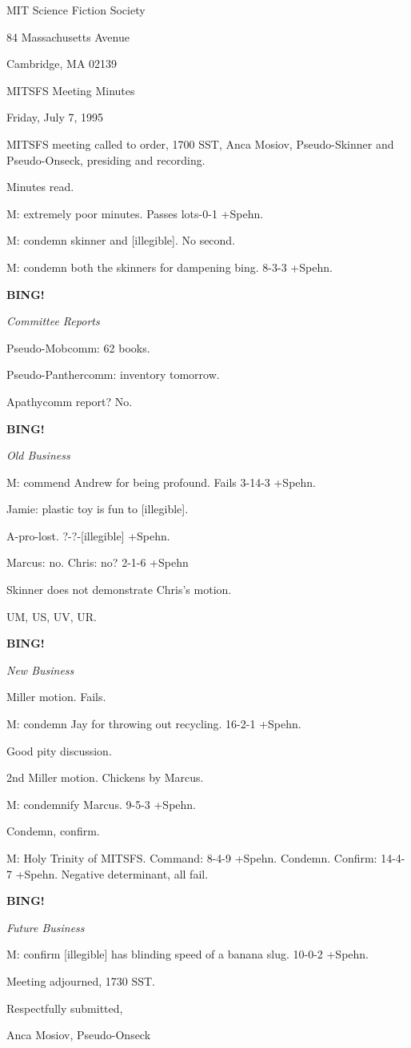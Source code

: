 \documentclass[12pt]{article}
\newcommand{\bing}{{\bf BING!} }
\newcommand{\goto}[1]{\bing \vskip 12pt \centerline{{\em{#1}}}}
\begin{document}
\begin{center}

MIT Science Fiction Society 

84 Massachusetts Avenue

Cambridge, MA 02139

\vspace{12pt}

MITSFS Meeting Minutes 

Friday, July 7, 1995

\end{center}
 
\vspace{18pt}

\setlength{\parskip}{6pt}

\noindent
MITSFS meeting called to order, 1700 SST,
Anca Mosiov, Pseudo-Skinner and Pseudo-Onseck, presiding and recording.

Minutes read.

M: extremely poor minutes. Passes lots-0-1 +Spehn.

M: condemn skinner and [illegible]. No second.

M: condemn both the skinners for dampening bing. 8-3-3 +Spehn.

\goto{Committee Reports}

Pseudo-Mobcomm: 62 books.

Pseudo-Panthercomm: inventory tomorrow.

Apathycomm report? No.

\goto{Old Business}

M: commend Andrew for being profound. Fails 3-14-3 +Spehn.

Jamie: plastic toy is fun to [illegible].

A-pro-lost. ?-?-[illegible] +Spehn.

Marcus: no. Chris: no? 2-1-6 +Spehn

Skinner does not demonstrate Chris's motion.

UM, US, UV, UR.

\goto{New Business}

Miller motion. Fails.

M: condemn Jay for throwing out recycling. 16-2-1 +Spehn.

Good pity discussion.

2nd Miller motion. Chickens by Marcus.

M: condemnify Marcus. 9-5-3 +Spehn.

Condemn, confirm.

M: Holy Trinity of MITSFS. Command: 8-4-9 +Spehn. Condemn. Confirm: 14-4-7 +Spehn. Negative determinant, all fail.

\goto{Future Business}

M: confirm [illegible] has blinding speed of a banana slug. 10-0-2 +Spehn.

\vspace{12pt}

\noindent
Meeting adjourned, 1730 SST.

\vspace{18pt}

\centerline{Respectfully submitted,}
\centerline{Anca Mosiov, Pseudo-Onseck}
\end{document}
